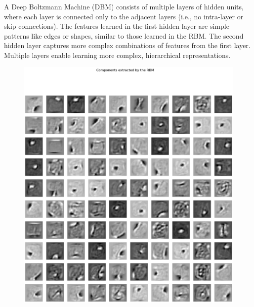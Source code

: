A Deep Boltzmann Machine (DBM) consists of multiple layers of hidden units, where each layer is connected only to the adjacent layers (i.e., no intra-layer or skip connections).
The features learned in the first hidden layer are simple patterns like edges or shapes, similar to those learned in the RBM.
The second hidden layer captures more complex combinations of features from the first layer.
Multiple layers enable learning more complex, hierarchical representations.

\begin{figure}[h!]
    \begin{minipage}[t]{0.19\textwidth}
        \includegraphics[width=\textwidth]{figures/rbm-features.png}
    \end{minipage}
    \hfill
    \begin{minipage}[t]{0.19\textwidth}

\end{minipage}
\end{figure}

